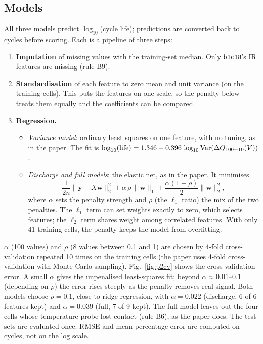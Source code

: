\subsection{Models}
All three models predict $\log_{10}$(cycle life); predictions are converted
back to cycles before scoring. Each is a pipeline of three steps:
\begin{enumerate}
  \item \textbf{Imputation} of missing values with the training-set median.
  Only \texttt{b1c18}'s IR features are missing (rule B9).
  \item \textbf{Standardisation} of each feature to zero mean and unit
  variance (on the training cells). This puts the features on one scale,
  so the penalty below treats them equally and the coefficients can be
  compared.
  \item \textbf{Regression.}
  \begin{itemize}
    \item \emph{Variance model}: ordinary least squares on one feature, with
    no tuning, as in the paper. The fit is
    $\log_{10}(\text{life}) = 1.346 - 0.396\,\log_{10}\mathrm{Var}(\Delta Q_{100-10}(V))$.
    \item \emph{Discharge and full models}: the elastic net, as in the
    paper. It minimises
    \begin{equation}
      \frac{1}{2n}\lVert \mathbf{y}-X\mathbf{w}\rVert_2^2
      + \alpha\,\rho\,\lVert\mathbf{w}\rVert_1
      + \frac{\alpha(1-\rho)}{2}\lVert\mathbf{w}\rVert_2^2 ,
    \end{equation}
    where $\alpha$ sets the penalty strength and $\rho$ (the $\ell_1$
    ratio) the mix of the two penalties. The $\ell_1$ term can set
    weights exactly to zero, which selects features; the $\ell_2$ term
    shares weight among correlated features. With only 41 training cells,
    the penalty keeps the model from overfitting.
  \end{itemize}
\end{enumerate}
$\alpha$ (100 values) and $\rho$ (8 values between 0.1 and 1) are chosen by
4-fold cross-validation repeated 10 times on the training cells (the paper
uses 4-fold cross-validation with Monte Carlo sampling).
Fig.~\ref{fig:p2cv} shows the cross-validation error. A small $\alpha$
gives the unpenalised least-squares fit; beyond $\alpha \approx 0.01$--$0.1$
(depending on $\rho$) the error rises steeply as the penalty removes real
signal. Both models choose
$\rho = 0.1$, close to ridge regression, with $\alpha = 0.022$ (discharge,
6 of 6 features kept) and $\alpha = 0.039$ (full, 7 of 9 kept). The full
model leaves out the four cells whose temperature probe lost contact (rule
B6), as the paper does. The test sets are evaluated once. RMSE and mean
percentage error are computed on cycles, not on the log scale.

